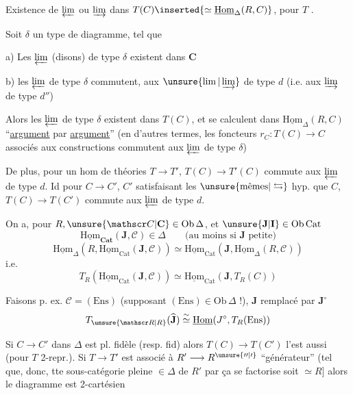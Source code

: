 Existence de $\varprojlim$ ou $\varinjlim$ dans $T(C)\inserted{\simeq\underline{\mathrm{Hom}}_{\Delta}(R,C)}$, pour $T$ .

Soit $\delta$ un type de diagramme, tel que

a) Les $\varprojlim$ (disons) de type $\delta$ existent dans $\mathbf C$

b) les $\varprojlim$ de type $\delta$ commutent,   aux $\unsure{\lim|\varinjlim}$ de type $d$ (i.e. aux $\varinjlim$ de type $d''$)

Alors les $\varprojlim$ de type $\delta$ existent dans $T(C)$, et se calculent dans $\underline{\mathrm{Hom}}_{\Delta}(R,C)$ ``\uline{argument} par \uline{argument}'' (en d'autres termes, les foncteurs $r_{C}:T(C)\longrightarrow C$ associés aux constructions commutent aux $\varprojlim$ de type $\delta$)

De plus, pour un hom de théories  $T\longrightarrow T'$, $T(C)\longrightarrow T'(C)$ commute aux $\varprojlim$ de type $d$. Id pour $C\longrightarrow C'$, $C'$ satisfaisant les $\unsure{\text{mêmes}|\leftrightarrows}$ hyp. que $C$, $T(C)\longrightarrow T(C')$ commute aux $\varprojlim$ de type $d$.

On a, pour $R,\unsure{\mathscr C|\mathbf C}\in\mathrm{Ob}\,\Delta$,  et $\unsure{\mathbf J|\mathbf I}\in\mathrm{Ob}\,\mathrm{Cat}$
\[
\underline{\mathrm{Hom}}_{\mathbf{Cat}}(\mathbf J,\mathscr C)\in\Delta
\qquad\text{(au moins si $\mathbf J$ petite)}
\]
\[
\underline{\mathrm{Hom}}_{\Delta}(R,\underline{\mathrm{Hom}}_{\mathrm{Cat}}(\mathbf J,\mathscr C))
\simeq\underline{\mathrm{Hom}}_{\mathrm{Cat}}(\mathbf J,\underline{\mathrm{Hom}}_{\Delta}(R,\mathscr C))
\]
i.e.
\[
\boxed{T_R(\underline{\mathrm{Hom}}_{\mathrm{Cat}}(\mathbf J,\mathscr C))\simeq
\underline{\mathrm{Hom}}_{\mathrm{Cat}}(\mathbf J,T_R(C))}
\]

Faisons p. ex. $\mathscr C=(\mathrm{Ens})$ (supposant $(\mathrm{Ens})\in\mathrm{Ob}\,\Delta$ !), $\mathbf J$ remplacé par $\mathbf J^{\circ}$
\[
T_{\unsure{\mathscr R|R}}(\widehat{\mathbf J})\overset{\sim}{\simeq}\underline{\mathrm{Hom}}(J^{\circ},T_R(\mathrm{Ens}))
\]

Si $C\longrightarrow C'$ dans $\Delta$ est pl. fidèle (resp. fid) alors $T(C)\longrightarrow T(C')$ l'est aussi (pour $T$ 2-repr.).  Si $T\longrightarrow T'$ est associé à $R'\longrightarrow R^{\unsure{\prime\prime|\prime}}$ ``\inserted{$\Delta$-}générateur'' (tel que, donc, tte sous-catégorie pleine $\in\Delta$ de $R'$ par  ça se factorise soit  $\simeq R$] alors le diagramme
est 2-cartésien
